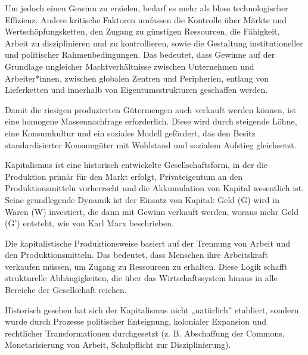 \documentclass[
  nswissgerman,
  a4paper,
  DIV=11,
  numbers=noendperiod,
  oneside,
  openany]{scrreprt}
\begin{document}
Um jedoch einen Gewinn zu erzielen, bedarf es mehr als bloss
technologischer Effizienz. Andere kritische Faktoren umfassen die
Kontrolle über Märkte und Wertschöpfungsketten, den Zugang zu günstigen
Ressourcen, die Fähigkeit, Arbeit zu disziplinieren und zu
kontrollieren, sowie die Gestaltung institutioneller und politischer
Rahmenbedingungen. Das bedeutet, dass Gewinne auf der Grundlage
ungleicher Machtverhältnisse zwischen Unternehmen und Arbeiter*innen,
zwischen globalen Zentren und Peripherien, entlang von Lieferketten und
innerhalb von Eigentumsstrukturen geschaffen werden.

Damit die riesigen produzierten Gütermengen auch verkauft werden können,
ist eine homogene Massennachfrage erforderlich. Diese wird durch
steigende Löhne, eine Konsumkultur und ein soziales Modell gefördert,
das den Besitz standardisierter Konsumgüter mit Wohlstand und sozialem
Aufstieg gleichsetzt.

\begin{tcolorbox}[enhanced jigsaw, arc=.35mm, bottomrule=.15mm, bottomtitle=1mm, breakable, colback=white, colbacktitle=quarto-callout-note-color!10!white, colframe=quarto-callout-note-color-frame, coltitle=black, left=2mm, leftrule=.75mm, opacityback=0, opacitybacktitle=0.6, rightrule=.15mm, title={Was ist Kapitalismus?}, titlerule=0mm, toprule=.15mm, toptitle=1mm]

Kapitalismus ist eine historisch entwickelte Gesellschaftsform, in der
die Produktion primär für den Markt erfolgt, Privateigentum an den
Produktionsmitteln vorherrscht und die Akkumulation von Kapital
wesentlich ist. Seine grundlegende Dynamik ist der Einsatz von Kapital:
Geld (G) wird in Waren (W) investiert, die dann mit Gewinn verkauft
werden, woraus mehr Geld (G') entsteht, wie von Karl Marx beschrieben.

Die kapitalistische Produktionsweise basiert auf der Trennung von Arbeit
und den Produktionsmitteln. Das bedeutet, dass Menschen ihre
Arbeitskraft verkaufen müssen, um Zugang zu Ressourcen zu erhalten.
Diese Logik schafft strukturelle Abhängigkeiten, die über das
Wirtschaftssystem hinaus in alle Bereiche der Gesellschaft reichen.

Historisch gesehen hat sich der Kapitalismus nicht „natürlich''
etabliert, sondern wurde durch Prozesse politischer Enteignung,
kolonialer Expansion und rechtlicher Transformationen durchgesetzt (z.
B. Abschaffung der Commons, Monetarisierung von Arbeit, Schulpflicht zur
Disziplinierung).

\end{tcolorbox}
\end{document}
